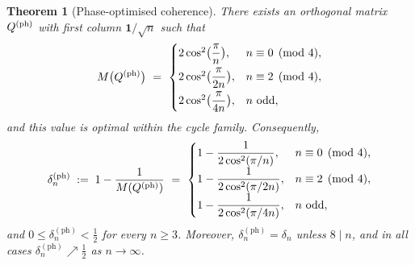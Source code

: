 \documentclass[12pt,fleqn]{amsart}
\renewcommand{\le}{\leqslant}
\renewcommand{\ge}{\geqslant}
\newtheorem{thm}{Theorem}
\theoremstyle{remark}
\newcommand{\1}{\mathbf{1}}
\begin{document}
\begin{thm}[Phase-optimised coherence]\label{thm:phase-correct}
There exists an orthogonal matrix $Q^{\rm (ph)}$ with first column $\1/\sqrt n$ such that
\[
M\big(Q^{\rm (ph)}\big)\ =\
\begin{cases}
2\cos^2\!\big(\dfrac{\pi}{n}\big),   & n\equiv 0\pmod{4},\\[2mm]
2\cos^2\!\big(\dfrac{\pi}{2n}\big),  & n\equiv 2\pmod{4},\\[2mm]
2\cos^2\!\big(\dfrac{\pi}{4n}\big),  & n\ \mathrm{odd},
\end{cases}
\]
and this value is optimal within the cycle family.
Consequently,
\[
\delta^{\mathrm{(ph)}}_n \;:=\;
1-\frac{1}{ M(Q^{\rm (ph)})}
\ =\
\begin{cases}
\displaystyle 1-\dfrac{1}{2\cos^2(\pi/n)},   & n\equiv 0\pmod{4},\\[2mm]
\displaystyle 1-\dfrac{1}{2\cos^2(\pi/2n)},  & n\equiv 2\pmod{4},\\[2mm]
\displaystyle 1-\dfrac{1}{2\cos^2(\pi/4n)},  & n\ \text{odd},
\end{cases}
\]
and $0\le \delta^{\mathrm{(ph)}}_n<\tfrac12$ for every $n\ge 3$. Moreover, $\delta^{\mathrm{(ph)}}_n=\delta_n$ unless $8\mid n$, and in all cases $\delta^{\mathrm{(ph)}}_n \nearrow \tfrac12$ as $n\to\infty$.
\end{thm}
\end{document}
